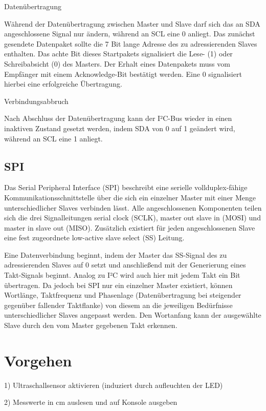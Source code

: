 \documentclass[parskip,
							 oneside,
							 11pt,
							 noheadingspace,
							 accentcolor=tud1d,
							 bigchapter,
							 colorback]{tudreport}
\begin{document}
Datenübertragung

Während der Datenübertragung zwischen Master und Slave darf sich das an SDA angeschlossene Signal nur ändern, während an SCL eine 0 anliegt. Das zunächst gesendete Datenpaket sollte die 7 Bit lange Adresse des zu adressierenden Slaves enthalten. Das achte Bit dieses Startpakets signalisiert die Lese- (1) oder Schreibabsicht (0) des Masters. Der Erhalt eines Datenpakets muss vom Empfänger mit einem Acknowledge-Bit bestätigt werden. Eine 0 signalisiert hierbei eine erfolgreiche Übertragung.

Verbindungsabbruch

Nach Abschluss der Datenübertragung kann der I²C-Bus wieder in einen inaktiven Zustand gesetzt werden, indem SDA von 0 auf 1 geändert wird, während an SCL eine 1 anliegt.

\section{SPI}

Das Serial Peripheral Interface (SPI) beschreibt eine serielle vollduplex-fähige Kommunikationsschnittstelle über die sich ein einzelner Master mit einer Menge unterschiedlicher Slaves verbinden lässt. Alle angeschlossenen Komponenten teilen sich die drei Signalleitungen serial clock (SCLK), master out slave in (MOSI) und master in slave out (MISO). Zusätzlich existiert für jeden angeschlossenen Slave eine fest zugeordnete low-active slave select (SS) Leitung.

Eine Datenverbindung beginnt, indem der Master das SS-Signal des zu adressierenden Slaves auf 0 setzt und anschließend mit der Generierung eines Takt-Signals beginnt. Analog zu I²C wird auch hier mit jedem Takt ein Bit übertragen. Da jedoch bei SPI nur ein einzelner Master existiert, können Wortlänge, Taktfrequenz und Phasenlage (Datenübertragung bei steigender gegenüber fallender Taktflanke) von diesem an die jeweiligen Bedürfnisse unterschiedlicher Slaves angepasst werden. Den Wortanfang kann der ausgewählte Slave durch den vom Master gegebenen Takt erkennen. 

\chapter{Vorgehen}


1) Ultraschallsensor aktivieren (induziert durch aufleuchten der LED)

2) Messwerte in cm auslesen und auf Konsole ausgeben
\end{document}
